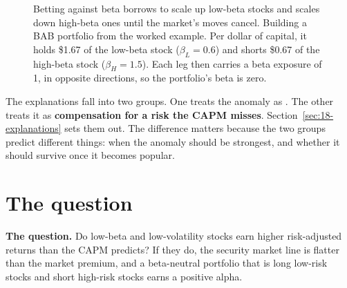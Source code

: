 \begin{figure}[htbp]
\centering
{}
\caption{Betting against beta borrows to scale up low-beta stocks and scales down high-beta ones until the market's moves cancel. Building a BAB portfolio from the worked example. Per dollar of capital, it holds \$1.67 of the low-beta stock ($\beta_L = 0.6$) and shorts \$0.67 of the high-beta stock ($\beta_H = 1.5$). Each leg then carries a beta exposure of 1, in opposite directions, so the portfolio's beta is zero.}
\label{fig:18-bab}
\end{figure}

The explanations fall into two groups. One treats the anomaly as . The other treats it as \textbf{compensation for a risk the CAPM misses}. Section~\ref{sec:18-explanations} sets them out. The difference matters because the two groups predict different things: when the anomaly should be strongest, and whether it should survive once it becomes popular.

\section{The question}
\label{sec:18-claim}

\begin{callout}
\textbf{The question.} Do low-beta and low-volatility stocks earn higher risk-adjusted returns than the CAPM predicts? If they do, the security market line is flatter than the market premium, and a beta-neutral portfolio that is long low-risk stocks and short high-risk stocks earns a positive alpha.
\end{callout}

